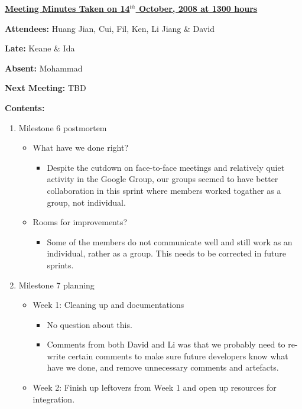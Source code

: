 \documentclass{letter}
\begin{document}
{\large \textbf{\underline{Meeting Minutes Taken on 14$^{th}$ October, 2008 at 1300 hours}}}

\textbf{Attendees:} Huang Jian, Cui, Fil, Ken, Li Jiang \& David

\textbf{Late:} Keane \& Ida

\textbf{Absent:} Mohammad

\textbf{Next Meeting:} TBD

\textbf{Contents:}

\begin{enumerate}
    \item Milestone 6 postmortem
        \begin{itemize}
            \item What have we done right?
                \begin{itemize}
                    \item Despite the cutdown on face-to-face meetings and relatively quiet activity in the Google Group, our groups seemed to have better collaboration in this sprint where members worked togather as a group, not individual. 
                \end{itemize}
            \item Rooms for improvements?
                \begin{itemize}
                    \item Some of the members do not communicate well and still work as an individual, rather as a group. This needs to be corrected in future sprints. 
                \end{itemize}
        \end{itemize}
    \item Milestone 7 planning
        \begin{itemize}
            \item Week 1: Cleaning up and documentations
                \begin{itemize}
                    \item No question about this. 
                    \item Comments from both David and Li was that we probably need to re-write certain comments to make sure future developers know what have we done, and remove unnecessary comments and artefacts. 
                \end{itemize}
            \item Week 2: Finish up leftovers from Week 1 and open up resources for integration. 
                \begin{itemize}

\end{itemize}
\end{itemize}
\end{enumerate}
\end{document}
